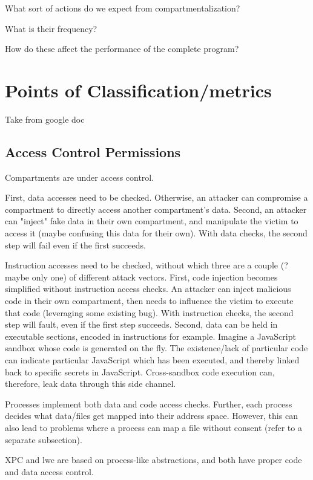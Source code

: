 What sort of actions do we expect from compartmentalization?

What is their frequency?

How do these affect the performance of the complete program?


\section{Points of Classification/metrics}

Take from google doc

\subsection{Access Control Permissions}

Compartments are under access control. 

First, data accesses need to be checked. 
Otherwise, an attacker can compromise a compartment to directly access another
compartment's data.
Second, an attacker can "inject" fake data in their own compartment, and 
manipulate the victim to access it (maybe confusing this data for their own).
With data checks, the second step will fail even if the first succeeds.

Instruction accesses need to be checked, without which three are a 
couple (? maybe only one) of different attack vectors.
First, code injection becomes simplified without instruction access checks.
An attacker can inject malicious code in their own compartment, then needs
to influence the victim to execute that code (leveraging some existing bug).
With instruction checks, the second step will fault, even if the first step
succeeds.
Second, data can be held in executable sections, encoded in instructions for example.
Imagine a JavaScript sandbox whose code is generated on the fly. 
The existence/lack of particular code can indicate particular JavaScript which has
been executed, and thereby linked back to specific secrets in JavaScript.
Cross-sandbox code execution can, therefore, leak data through this side channel.

Processes implement both data and code access checks. 
Further, each process decides what data/files get mapped into their address space.
However, this can also lead to problems where a process can map a file without
consent (refer to a separate subsection).

XPC and lwc are based on process-like abstractions, and both have proper
code and data access control.


